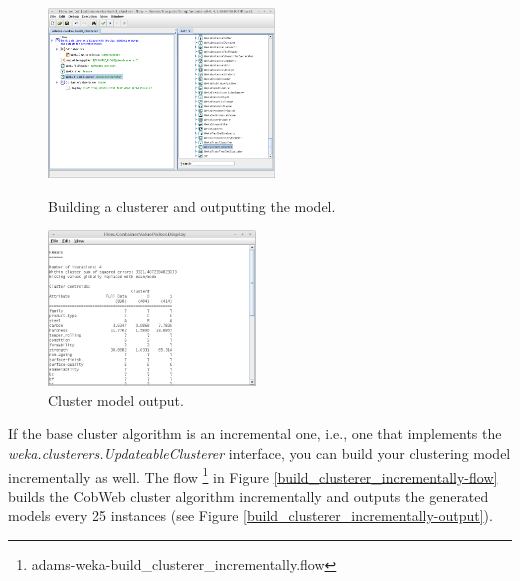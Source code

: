 \begin{figure}[ht]
  \begin{minipage}[t]{0.5\linewidth}
    \centering
    \includegraphics[width=6.0cm]{images/build_clusterer-flow.png}
    \caption{Building a clusterer and outputting the model.}
    \label{build_clusterer-flow}
  \end{minipage}
  \hspace{0.5cm}
  \begin{minipage}[t]{0.5\linewidth}
    \centering
    \includegraphics[width=5.5cm]{images/build_clusterer-output.png}
    \caption{Cluster model output.}
    \label{build_clusterer-output}
  \end{minipage}
\end{figure}

If the base cluster algorithm is an incremental one, i.e., one that implements
the \textit{weka.clusterers.UpdateableClusterer} interface, you can build your
clustering model incrementally as well. The flow
\footnote{adams-weka-build\_clusterer\_incrementally.flow} in Figure
\ref{build_clusterer_incrementally-flow} builds the CobWeb cluster algorithm
incrementally and outputs the generated models every 25 instances (see Figure
\ref{build_clusterer_incrementally-output}).

